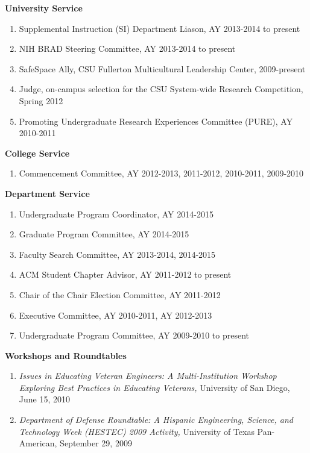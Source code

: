 \documentclass[11pt]{letter}
\begin{document}

\textbf{University Service}
\begin{enumerate}
\item Supplemental Instruction (SI) Department Liason, AY 2013-2014 to present
\item NIH BRAD Steering Committee, AY 2013-2014 to present
\item SafeSpace Ally, CSU Fullerton Multicultural Leadership Center, 2009-present
\item Judge, on-campus selection for the CSU System-wide Research Competition, Spring 2012
\item Promoting Undergraduate Research Experiences Committee (PURE), AY 2010-2011
\end{enumerate}

\textbf{College Service}
\begin{enumerate}
\item Commencement Committee, AY 2012-2013, 2011-2012, 2010-2011, 2009-2010
\end{enumerate}

\textbf{Department Service}
\begin{enumerate}
\item Undergraduate Program Coordinator, AY 2014-2015
\item Graduate Program Committee, AY 2014-2015
\item Faculty Search Committee, AY 2013-2014, 2014-2015
\item ACM Student Chapter Advisor, AY 2011-2012 to present
\item Chair of the Chair Election Committee, AY 2011-2012
\item Executive Committee, AY 2010-2011, AY 2012-2013
\item Undergraduate Program Committee, AY 2009-2010 to present
\end{enumerate}

\textbf{Workshops and Roundtables}
\begin{enumerate}
\item \emph{Issues in Educating Veteran Engineers: A Multi-Institution Workshop Exploring Best Practices in Educating Veterans,} University of San Diego, June 15, 2010
\item \emph{Department of Defense Roundtable: A Hispanic Engineering, Science, and Technology Week (HESTEC) 2009 Activity,} University of Texas Pan-American, September 29, 2009
\end{enumerate}
\end{document}
